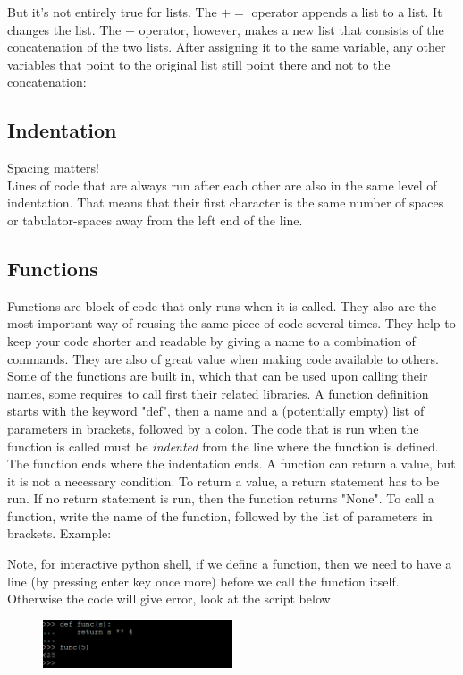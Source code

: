 \documentclass[10pt,a4paper]{article}
\begin{document}
But it's not entirely true for lists.
The $+=$ operator appends a list to a list. It changes the list. The $+$ operator, however, makes a new list that consists of the concatenation of the two lists. After assigning it to the same variable, any other variables that point to the original list still point there and not to the concatenation:



\subsection{Indentation}
\label{subsec:indentation}
Spacing matters!\\
Lines of code that are always run after each other are also in the same level of indentation. That means that their first character is the same number of spaces or tabulator-spaces away from the left end of the line.
\subsection{Functions}
Functions are block of code that only runs when it is called.
They also are the most important way of reusing the same piece of code several times. They help to keep your code shorter and readable by giving a name to a combination of commands.
They are also of great value when making code available to others. Some of the functions are built in, which that can be used upon calling their names, some requires to call first their related libraries. 
A function definition starts with the keyword "def", then a name and a (potentially empty) list of parameters in brackets, followed by a colon. The code that is run when the function is called must be \textit{indented} from the line where the function is defined. The function ends where the indentation ends.
A function can return a value, but it is not a necessary condition. To return a value, a return statement has to be run. If no return statement is run, then the function returns "None".
To call a function, write the name of the function, followed by the list of parameters in brackets.
Example:

Note, for interactive python shell, if we define a function, then we need to have a line (by pressing enter key once more) before we call the function itself. Otherwise the code will give error, look at the script below
\begin{figure}[h] \centering
\includegraphics[width=0.5\textwidth]{func.PNG}
\end{figure}
\end{document}
